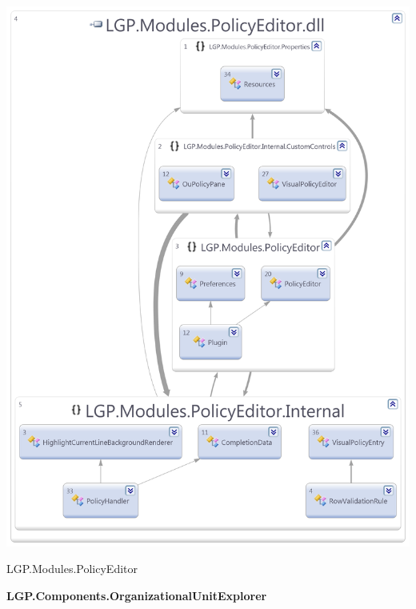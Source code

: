 		\begin{figurehere}
			\centering
			\includegraphics[scale=0.70]{pages/appendix3/figures/dllscreens/policyeditor.png}
			\caption{LGP.Modules.PolicyEditor}
		\end{figurehere}
		
		
\newpage
	
	
	\large{\bfseries{LGP.Components.OrganizationalUnitExplorer}}
	\vspace{5mm}
	
